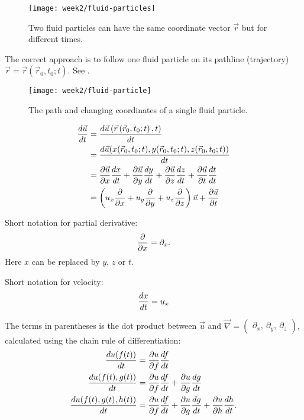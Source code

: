 \begin{figure}[!h]
    \centering
    \texttt{[image: week2/fluid-particles]}
    \caption{Two fluid particles can have the same coordinate vector $\vec{r}$ but for different times.}
    \label{fig:fluid-particles}
\end{figure}
The correct approach is to follow one fluid particle on its pathline (trajectory) $\vec{r}=\vec{r}(\vec{r}_0,t_0;t)$. See .
\begin{figure}[!h]
    \centering
    \texttt{[image: week2/fluid-particle]}
    \caption{The path and changing coordinates of a single fluid particle.}
    \label{fig:fluid-particle}
\end{figure}
\begin{align}
\frac{d \vec{u}}{d t} &= \frac{d \vec{u}\left(\vec{r}\left(\vec{r}_0,t_0;t\right),t\right)}{d t}\\
&=\frac{d \vec{u}(x(\vec{r}_0,t_0;t),y(\vec{r}_0,t_0;t),z(\vec{r}_0,t_0;t))}{d t}\\
&=\frac{\partial \vec{u}}{\partial x}\frac{d x}{d t} + \frac{\partial \vec{u}}{\partial y}\frac{d y}{d t} + \frac{\partial \vec{u}}{\partial z}\frac{d z}{d t} + \frac{\partial \vec{u}}{\partial t}\frac{d t}{d t}\\
&= \left(u_x\frac{\partial }{\partial x} + u_y\frac{\partial }{\partial y} + u_z\frac{\partial }{\partial z}\right)\vec{u}+\frac{\partial \vec{u}}{\partial t}
\end{align}
\begin{framed}
Short notation for partial derivative:
\begin{equation}
\frac{\partial }{\partial x} = \partial_x.
\end{equation}
Here $x$ can be replaced by $y$, $z$ or $t$.

Short notation for velocity:
\begin{equation}
\frac{d x}{d t} = u_x
\end{equation}
\end{framed}
The terms in parentheses is the dot product between $\vec{u}$ and $\vec{\nabla} = \begin{pmatrix}\partial_x,\ \partial_y,\ \partial_z\end{pmatrix}$,
calculated using the chain rule of differentiation:
\begin{align}
\frac{d u(f(t))}{d t} &= \frac{\partial u}{\partial f}\frac{d f}{d t}\\
\frac{d u(f(t),g(t))}{d t} &= \frac{\partial u}{\partial f}\frac{d f}{d t} + \frac{\partial u}{\partial g}\frac{d g}{d t}\\
\frac{d u(f(t),g(t),h(t))}{d t} &= \frac{\partial u}{\partial f}\frac{d f}{d t} + \frac{\partial u}{\partial g}\frac{d g}{d t} + \frac{\partial u}{\partial h}\frac{d h}{d t}.
\end{align}
